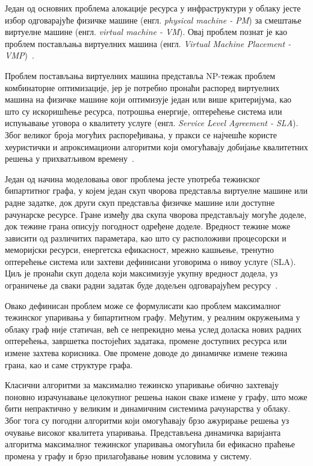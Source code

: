 Један од основних проблема алокације ресурса у инфраструктури у облаку јесте избор одговарајуће физичке машине (енгл. \textit{physical machine - PM}) за смештање виртуелне машине (енгл. \textit{virtual machine - VM}). Овај проблем познат је као проблем постављања виртуелних машина (енгл. \textit{Virtual Machine Placement - VMP})~\cite{piresVirtualMachinePlacement2015}. 

Проблем постављања виртуелних машина представља NP-тежак проблем комбинаторне оптимизације, јер је потребно пронаћи распоред виртуелних машина на физичке машине који оптимизује један или више критеријума, као што су искоришћење ресурса, потрошња енергије, оптерећење система или испуњавање уговора о квалитету услуге (енгл. \textit{Service Level Agreement - SLA}). Због великог броја могућих распоређивања, у пракси се најчешће користе хеуристички и апроксимациони алгоритми који омогућавају добијање квалитетних решења у прихватљивом времену~\cite{perez-salazarDynamicResourceAllocation2022a}.

Један од начина моделовања овог проблема јесте употреба тежинског бипартитног графа, у којем један скуп чворова представља виртуелне машине или радне задатке, док други скуп представља физичке машине или доступне рачунарске ресурсе. Гране између два скупа чворова представљају могуће доделе, док тежине грана описују погодност одређене доделе. Вредност тежине може зависити од различитих параметара, као што су расположиви процесорски и меморијски ресурси, енергетска ефикасност, мрежно кашњење, тренутно оптерећење система или захтеви дефинисани уговорима о нивоу услуге (SLA). Циљ је пронаћи скуп додела који максимизује укупну вредност додела, уз ограничење да сваки радни задатак буде додељен одговарајућем ресурсу~\cite{kumarBipartiteGraphBasedResource2025}.

Овако дефинисан проблем може се формулисати као проблем максималног тежинског упаривања у бипартитном графу. Међутим, у реалним окружењима у облаку граф није статичан, већ се непрекидно мења услед доласка нових радних оптерећења, завршетка постојећих задатака, промене доступних ресурса или измене захтева корисника. Ове промене доводе до динамичке измене тежина грана, као и саме структуре графа.

Класични алгоритми за максимално тежинско упаривање обично захтевају поновно израчунавање целокупног решења након сваке измене у графу, што може бити непрактично у великим и динамичним системима рачунарства у облаку. Због тога су погодни алгоритми који омогућавају брзо ажурирање решења уз очување високог квалитета упаривања. Представљена динамичка варијанта алгоритма максималног тежинског упаривања омогућила би ефикасно праћење промена у графу и брзо прилагођавање новим условима у систему.

